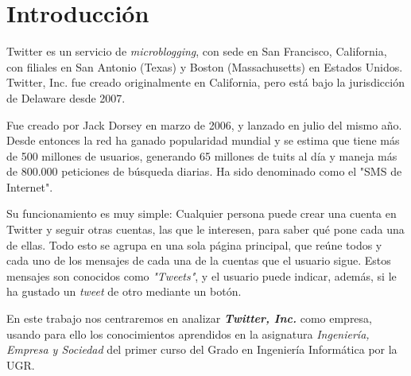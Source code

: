 \documentclass[12pt, spanish]{article}
\begin{document}

\tableofcontents
\pagebreak


\section{Introducción}

Twitter es un servicio de \textit{microblogging}, con sede en San Francisco, California, con filiales en San Antonio (Texas) y Boston (Massachusetts) en Estados Unidos. Twitter, Inc. fue creado originalmente en California, pero está bajo la jurisdicción de Delaware desde 2007. 

Fue creado por Jack Dorsey en marzo de 2006, y lanzado en julio del mismo año. Desde entonces la red ha ganado popularidad mundial y se estima que tiene más de 500 millones de usuarios, generando 65 millones de tuits al día y maneja más de 800.000 peticiones de búsqueda diarias. Ha sido denominado como el "SMS de Internet".

Su funcionamiento es muy simple: Cualquier persona puede crear una cuenta en Twitter y seguir otras cuentas, las que le interesen, para saber qué pone cada una de ellas. Todo esto se agrupa en una sola página principal, que reúne todos y cada uno de los mensajes de cada una de la cuentas que el usuario sigue. Estos mensajes son conocidos como \textit{"Tweets"}, y el usuario puede indicar, además, si le ha gustado un \textit{tweet} de otro mediante un botón.

En este trabajo nos centraremos en analizar \textbf{\textit{Twitter, Inc.}} como empresa, usando para ello los conocimientos aprendidos en la asignatura \textit{Ingeniería, Empresa y Sociedad} del primer curso del Grado en Ingeniería Informática por la UGR.


\newpage



\end{document}
